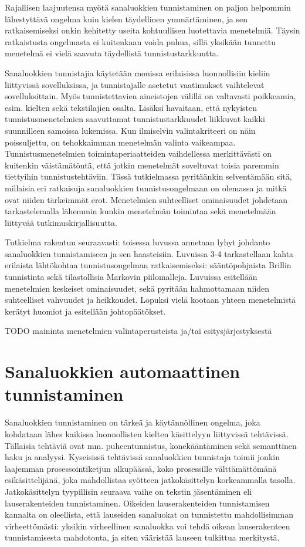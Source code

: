 \documentclass[utf8,bachelor,manualbib]{gradu3}
\begin{document}
Rajallisen laajuutensa myötä sanaluokkien tunnistaminen on paljon helpommin lähestyttävä ongelma kuin kielen täydellinen ymmärtäminen, ja sen ratkaisemiseksi onkin kehitetty useita kohtuullisen luotettavia menetelmiä. Täysin ratkaistusta ongelmasta ei kuitenkaan voida puhua, sillä yksikään tunnettu menetelmä ei vielä saavuta täydellistä tunnistustarkkuutta.

Sanaluokkien tunnistajia käytetään monissa erilaisissa luonnollisiin kieliin liittyvissä sovelluksissa, ja tunnistajalle asetetut vaatimukset vaihtelevat sovelluksittain. Myös tunnistettavien aineistojen välillä on valtavasti poikkeamia, esim. kielten sekä tekstilajien osalta. Lisäksi havaitaan, että nykyisten tunnistusmenetelmien saavuttamat tunnistustarkkuudet liikkuvat kaikki suunnilleen samoissa lukemissa. Kun ilmiselvin valintakriteeri on näin poissuljettu, on tehokkaimman menetelmän valinta vaikeampaa. Tunnistusmenetelmien toimintaperiaatteiden vaihdellessa merkittävästi on kuitenkin väistämätöntä, että jotkin menetelmät soveltuvat toisia paremmin tiettyihin tunnistustehtäviin. Tässä tutkielmassa pyritäänkin selventämään sitä, millaisia eri ratkaisuja sanaluokkien tunnistusongelmaan on olemassa ja mitkä ovat niiden tärkeimmät erot. Menetelmien suhteelliset ominaisuudet johdetaan tarkastelemalla lähemmin kunkin menetelmän toimintaa sekä menetelmään liittyvää tutkimuskirjallisuutta. 

Tutkielma rakentuu seuraavasti: toisessa luvussa annetaan lyhyt johdanto sanaluokkien tunnistamiseen ja sen haasteisiin. Luvuissa 3-4 tarkastellaan kahta erilaista lähtökohtaa tunnistusongelman ratkaisemiseksi: sääntöpohjaista Brillin tunnistinta sekä tilastollisia Markovin piilomalleja. Luvuissa esitellään menetelmien keskeiset ominaisuudet, sekä pyritään hahmottamaan niiden suhteelliset vahvuudet ja heikkoudet. Lopuksi vielä kootaan yhteen menetelmistä kerätyt huomiot ja esitellään johtopäätökset.

TODO maininta menetelmien valintaperusteista ja/tai esitysjärjestyksestä


\chapter{Sanaluokkien automaattinen tunnistaminen}

Sanaluokkien tunnistaminen on tärkeä ja käytännöllinen ongelma, joka kohdataan lähes kaikissa luonnollisten kielten käsittelyyn liittyvissä tehtävissä. Tällaisia tehtäviä ovat mm. puheentunnistus, konekääntäminen sekä semanttinen haku ja analyysi. Kyseisissä tehtävissä sanaluokkien tunnistaja toimii jonkin laajemman prosessointiketjun alkupäässä, koko prosessille välttämättömänä esikäsittelijänä, joka mahdollistaa syötteen jatkokäsittelyn korkeammalla tasolla. Jatkokäsittelyn tyypillisin seuraava vaihe on tekstin jäsentäminen eli lauserakenteiden tunnistaminen. Oikeiden lauserakenteiden tunnistamisen kannalta on oleellista, että lauseiden sanaluokat on tunnistettu mahdollisimman virheettömästi: yksikin virheellinen sanaluokka voi tehdä oikean lauserakenteen tunnistamisesta mahdotonta, ja siten vääristää lauseen tulkittua merkitystä.
\end{document}
